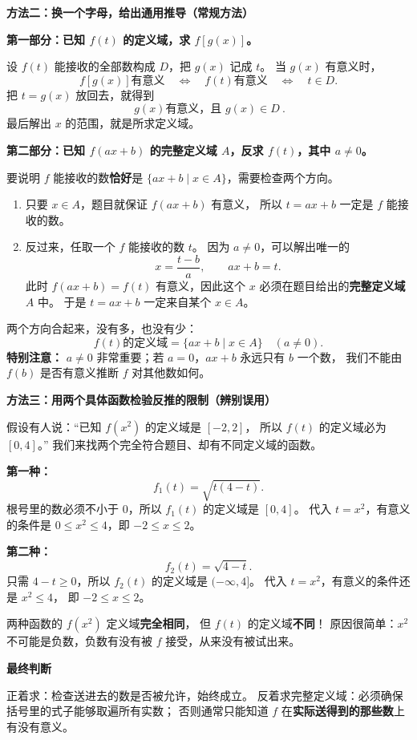 \clearpage
\begin{proofbox}
\textbf{\textcolor{CProof}{方法二：换一个字母，给出通用推导（常规方法）}}
\begin{center}\end{center}


\textbf{第一部分：已知 $f(t)$ 的定义域，求 $f[g(x)]$。}

设 $f(t)$ 能接收的全部数构成 $D$，把 $g(x)$ 记成 $t$。
当 $g(x)$ 有意义时，
\[
 f[g(x)]\text{有意义}
 \quad\Longleftrightarrow\quad
 f(t)\text{有意义}
 \quad\Longleftrightarrow\quad t\in D.
\]
把 $t=g(x)$ 放回去，就得到
\[
 \boxed{\ g(x)\text{有意义，且 }g(x)\in D\ }.
\]
最后解出 $x$ 的范围，就是所求定义域。

\textbf{第二部分：已知 $f(ax+b)$ 的完整定义域 $A$，反求 $f(t)$，其中 $a\ne0$。}

要说明 $f$ 能接收的数\textbf{恰好}是 $\{ax+b\mid x\in A\}$，需要检查两个方向。
\begin{enumerate}[leftmargin=*,itemsep=0.35em]
 \item 只要 $x\in A$，题目就保证 $f(ax+b)$ 有意义，
 所以 $t=ax+b$ 一定是 $f$ 能接收的数。
 \item 反过来，任取一个 $f$ 能接收的数 $t$。
 因为 $a\ne0$，可以解出唯一的
 \[
 x=\frac{t-b}{a},\qquad ax+b=t.
 \]
 此时 $f(ax+b)=f(t)$ 有意义，因此这个 $x$ 必须在题目给出的\textbf{完整定义域} $A$ 中。
 于是 $t=ax+b$ 一定来自某个 $x\in A$。
\end{enumerate}
两个方向合起来，没有多，也没有少：
\[
 \boxed{\ f(t)\text{的定义域}=\{ax+b\mid x\in A\}\quad(a\ne0).\ }
\]
\textbf{特别注意：} $a\ne0$ 非常重要；若 $a=0$，$ax+b$ 永远只有 $b$ 一个数，
我们不能由 $f(b)$ 是否有意义推断 $f$ 对其他数如何。

\medskip
\end{proofbox}
\clearpage
\begin{proofbox}
\textbf{\textcolor{CProof}{方法三：用两个具体函数检验反推的限制（辨别误用）}}
\begin{center}\end{center}


假设有人说：“已知 $f(x^2)$ 的定义域是 $[-2,2]$，
所以 $f(t)$ 的定义域必为 $[0,4]$。”
我们来找两个完全符合题目、却有不同定义域的函数。

\textbf{第一种：}
\[
 f_1(t)=\sqrt{t(4-t)}.
\]
根号里的数必须不小于 $0$，所以 $f_1(t)$ 的定义域是 $[0,4]$。
代入 $t=x^2$，有意义的条件是 $0\le x^2\le4$，即 $-2\le x\le2$。

\textbf{第二种：}
\[
 f_2(t)=\sqrt{4-t}.
\]
只需 $4-t\ge0$，所以 $f_2(t)$ 的定义域是 $(-\infty,4]$。
代入 $t=x^2$，有意义的条件还是 $x^2\le4$，
即 $-2\le x\le2$。

两种函数的 $f(x^2)$ 定义域\textbf{完全相同}，
但 $f(t)$ 的定义域\textbf{不同}！
原因很简单：$x^2$ 不可能是负数，负数有没有被 $f$ 接受，从来没有被试出来。

\medskip
\textbf{\textcolor{CProof}{最终判断}}

正着求：检查送进去的数是否被允许，始终成立。
反着求完整定义域：必须确保括号里的式子能够取遍所有实数；
否则通常只能知道 $f$ 在\textbf{实际送得到的那些数}上有没有意义。
\end{proofbox}

